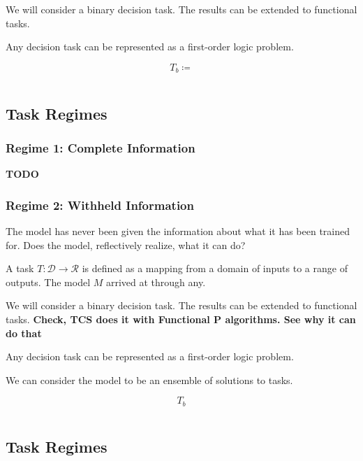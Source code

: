 \documentclass{article}
\begin{document}
We will consider a binary decision task. The results can be extended to
functional tasks.

Any decision task can be represented as a first-order logic problem.

\[
	T_b \coloneqq
\]

$$$$


\subsection{Task Regimes}

\subsubsection{Regime 1: Complete Information}
%
%

\textbf{TODO}

\subsubsection{Regime 2: Withheld Information}
%
The model has never been given the information about what it has been trained
for. Does the model, reflectively realize, what it can do?

A task $T: \mathcal{D} \rightarrow \mathcal{R}$ is defined as a mapping from a
domain of inputs to a range of outputs. The model $M$ arrived at through any.

We will consider a binary decision task. The results can be extended to
functional tasks. \textbf{Check, TCS does it with Functional P algorithms. See
	why it can do that}

Any decision task can be represented as a first-order logic problem.

We can consider the model to be an ensemble of solutions to tasks.

\[
	T_b
\]

$$$$


\subsection{Task Regimes}
\end{document}
